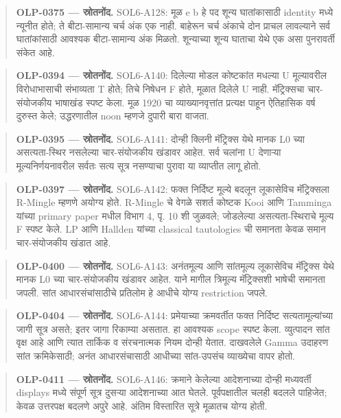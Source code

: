 \begin{quote}\small\textbf{OLP-0375 — स्रोतनोंद.} SOL6-A128: मूळ e b हे पद शून्य घातांकासाठी identity मध्ये न्यूनीत होते; ते बीटा-सामान्य चर्च अंक एक नाही. बाहेरून चर्च अंकाचे दोन प्राचल लावल्याने सर्व घातांकांसाठी आवश्यक बीटा-सामान्य अंक मिळतो. शून्याच्या शून्य घाताचा येथे एक असा पुनरावर्ती संकेत आहे.\end{quote}
\begin{quote}\small\textbf{OLP-0394 — स्रोतनोंद.} SOL6-A140: दिलेल्या मोडल कोष्टकांत मधल्या U मूल्यावरील विरोधाभासाची संभाव्यता T होते; तिचे निषेधन F होते, मूळात दिलेले U नाही. मॅट्रिक्सचा चार-संयोजकीय भाषाखंड स्पष्ट केला. मूळ 1920 चा व्याख्यानवृत्तांत प्रत्यक्ष पाहून ऐतिहासिक वर्ष दुरुस्त केले; उद्धरणातील noon म्हणजे दुपारी बारा वाजता.\end{quote}
\begin{quote}\small\textbf{OLP-0395 — स्रोतनोंद.} SOL6-A141: दोन्ही क्लिनी मॅट्रिक्स येथे मानक L0 च्या असत्यता-स्थिर नसलेल्या चार-संयोजकीय खंडावर आहेत. सर्व चलांना U देणाऱ्या मूल्यनिर्णयनावरील सर्वतः सत्य सूत्र नसण्याचा पुरावा या व्याप्तीत लागू होतो.\end{quote}
\begin{quote}\small\textbf{OLP-0397 — स्रोतनोंद.} SOL6-A142: फक्त निर्दिष्ट मूल्ये बदलून लूकासेविच मॅट्रिक्सला R-Mingle म्हणणे अयोग्य होते. R-Mingle चे वेगळे सशर्त कोष्टक Kooi आणि Tamminga यांच्या primary paper मधील विभाग 4, पृ. 10 शी जुळवले; जोडलेल्या असत्यता-स्थिराचे मूल्य F स्पष्ट केले. LP आणि Hallden यांच्या classical tautologies ची समानता केवळ समान चार-संयोजकीय खंडात आहे.\end{quote}
\begin{quote}\small\textbf{OLP-0400 — स्रोतनोंद.} SOL6-A143: अनंतमूल्य आणि सांतमूल्य लूकासेविच मॅट्रिक्स येथे मानक L0 च्या चार-संयोजकीय खंडावर आहेत. याने मागील त्रिमूल्य मॅट्रिक्सशी भाषेची समानता जपली. सांत आधारसंचांसाठीचे प्रतिलोम हे आधीचे योग्य restriction जपले.\end{quote}
\begin{quote}\small\textbf{OLP-0404 — स्रोतनोंद.} SOL6-A144: प्रमेयाच्या क्रमवर्तीत फक्त निर्दिष्ट सत्यतामूल्यांच्या जागी सूत्र असते; इतर जागा रिकाम्या असतात. हा आवश्यक scope स्पष्ट केला. व्युत्पादन सांत वृक्ष आहे आणि त्यात तार्किक व संरचनात्मक नियम दोन्ही येतात. दाखवलेले Gamma उदाहरण सांत क्रमिकेसाठी; अनंत आधारसंचासाठी आधीच्या सांत-उपसंच व्याख्येचा वापर होतो.\end{quote}
\begin{quote}\small\textbf{OLP-0411 — स्रोतनोंद.} SOL6-A146: क्रमाने केलेल्या आदेशनाच्या दोन्ही मध्यवर्ती displays मध्ये संपूर्ण सूत्र दुसऱ्या आदेशनाच्या आत घेतले. पूर्वपक्षातील चलही बदलले पाहिजेत; केवळ उत्तरपक्ष बदलणे अपुरे आहे. अंतिम विस्तारित सूत्रे मूळातच योग्य होती.\end{quote}
